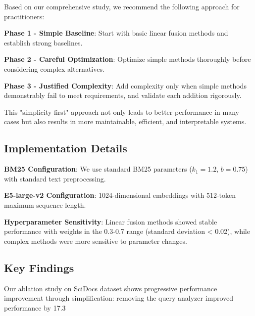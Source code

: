 \documentclass[letterpaper]{article} %
\begin{document}
Based on our comprehensive study, we recommend the following approach for practitioners:

\textbf{Phase 1 - Simple Baseline}: Start with basic linear fusion methods and establish strong baselines.

\textbf{Phase 2 - Careful Optimization}: Optimize simple methods thoroughly before considering complex alternatives.

\textbf{Phase 3 - Justified Complexity}: Add complexity only when simple methods demonstrably fail to meet requirements, and validate each addition rigorously.

This "simplicity-first" approach not only leads to better performance in many cases but also results in more maintainable, efficient, and interpretable systems.

\subsection{Implementation Details}

\textbf{BM25 Configuration}: We use standard BM25 parameters ($k_1 = 1.2$, $b = 0.75$) with standard text preprocessing.

\textbf{E5-large-v2 Configuration}: 1024-dimensional embeddings with 512-token maximum sequence length.

\textbf{Hyperparameter Sensitivity}: Linear fusion methods showed stable performance with weights in the 0.3-0.7 range (standard deviation < 0.02), while complex methods were more sensitive to parameter changes.

\subsection{Key Findings}

Our ablation study on SciDocs dataset shows progressive performance improvement through simplification: removing the query analyzer improved performance by 17.3%



\end{document}

